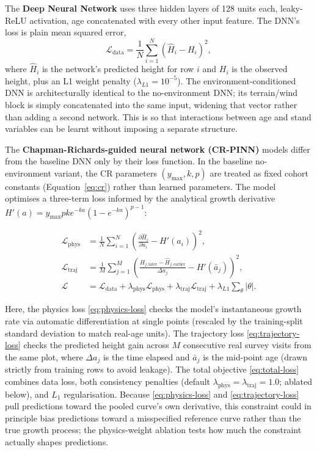 \documentclass[logo,msc,ai]{infthesis}           %
\begin{document}
The \textbf{Deep Neural Network} uses three hidden layers of 128 units each, leaky-ReLU activation, age concatenated with every other
input feature. The DNN's loss is plain mean squared error,
\begin{equation}
\mathcal{L}_{\text{data}} = \frac{1}{N}\sum_{i=1}^{N}\left(\hat H_i - H_i\right)^2,
\label{eq:data-loss}
\end{equation}
where $\hat H_i$ is the network's predicted height for row $i$ and $H_i$ is the observed height,
plus an L1 weight penalty ($\lambda_{L1}=10^{-5}$). The environment-conditioned DNN is
architecturally identical to the no-environment DNN; its terrain/wind block is simply concatenated
into the same input, widening that vector rather than adding a second network. This is so that interactions between age and stand variables can be learnt without imposing a separate structure.

The \textbf{Chapman-Richards-guided neural network (CR-PINN)} models differ from the baseline DNN only by their loss function. In the baseline no-environment variant, the CR parameters $(y_{\max}, k, p)$ are treated as fixed cohort constants (Equation~\ref{eq:cr}) rather than learned parameters. The model optimises a three-term loss informed by the analytical growth derivative $H'(a) = y_{\max} p k e^{-ka}(1 - e^{-ka})^{p-1}$:

\begin{subequations}
\label{eq:cr-pinn-losses}
\begin{align}
\mathcal{L}_{\text{phys}} &= \frac{1}{N}\sum_{i=1}^{N}\left(\frac{\partial \hat{H}_i}{\partial a_i} - H'(a_i)\right)^2, \label{eq:physics-loss} \\
\mathcal{L}_{\text{traj}} &= \frac{1}{M}\sum_{j=1}^{M}\left(\frac{\hat{H}_{j,\text{later}} - \hat{H}_{j,\text{earlier}}}{\Delta a_j} - H'(\bar{a}_j)\right)^2, \label{eq:trajectory-loss} \\
\mathcal{L} &= \mathcal{L}_{\text{data}} + \lambda_{\text{phys}}\mathcal{L}_{\text{phys}} + \lambda_{\text{traj}}\mathcal{L}_{\text{traj}} + \lambda_{L1}\sum_{\theta}|\theta|. \label{eq:total-loss}
\end{align}
\end{subequations}

Here, the physics loss \eqref{eq:physics-loss} checks the model's instantaneous growth rate via automatic differentiation at single points (rescaled by the training-split standard deviation to match real-age units). The trajectory loss \eqref{eq:trajectory-loss} checks the predicted height gain across $M$ consecutive real survey visits from the same plot, where $\Delta a_j$ is the time elapsed and $\bar{a}_j$ is the mid-point age (drawn strictly from training rows to avoid leakage). The total objective \eqref{eq:total-loss} combines data loss, both consistency penalties (default $\lambda_{\text{phys}}=\lambda_{\text{traj}}=1.0$; ablated below), and $L_1$ regularisation. Because \eqref{eq:physics-loss} and \eqref{eq:trajectory-loss} pull predictions toward the pooled curve's own derivative, this constraint could in principle bias predictions toward a misspecified reference curve rather than the true growth process; the physics-weight ablation tests how much the constraint actually shapes predictions. 
\end{document}
